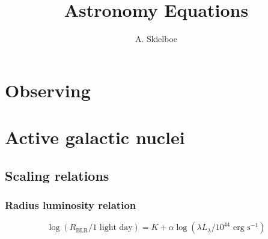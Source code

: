 \documentclass[preprint]{aastex}
\title{Astronomy Equations}
\author{A. Skielboe}
\begin{document}
\maketitle

\section{Observing}

\section{Active galactic nuclei}

\subsection{Scaling relations}

\subsubsection{Radius luminosity relation}

\begin{equation}
    \log(R_\textrm{BLR} / 1 \textrm{ light day}) = K+\alpha\log(\lambda L_\lambda / 10^{44} \textrm{ erg} \textrm{ s}^{-1})
\end{equation} \cite{2013ApJ...767..149B}



\end{document}
